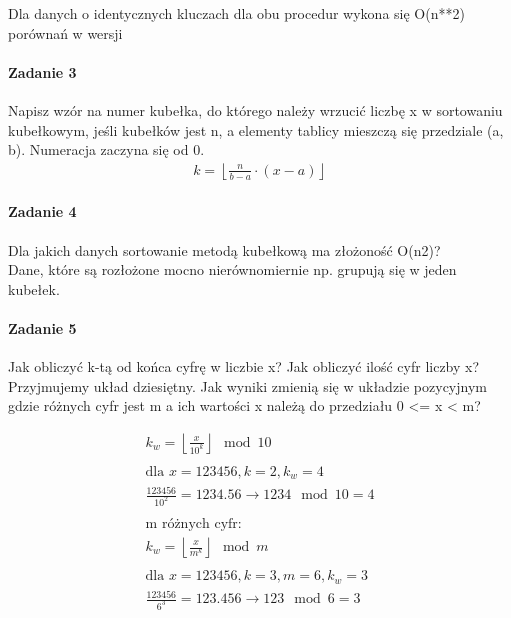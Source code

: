 \documentclass[18pt]{extarticle}
\begin{document}
Dla danych o identycznych kluczach dla obu procedur wykona się O(n**2) porównań w wersji 


\paragraph{Zadanie 3} Napisz wzór na numer kubełka, do którego należy wrzucić liczbę x w sortowaniu kubełkowym, jeśli kubełków jest n, a elementy tablicy mieszczą się przedziale (a, b). Numeracja zaczyna się od 0. \\


\begin{align*}
    k = \left \lfloor \frac{n}{b - a} \cdot (x - a) \right \rfloor
\end{align*}

\paragraph{Zadanie 4} Dla jakich danych sortowanie metodą kubełkową ma złożoność O(n2)? \\


Dane, które są rozłożone mocno nierównomiernie np. grupują się w jeden kubełek.

\paragraph{Zadanie 5} Jak obliczyć k-tą od końca cyfrę w liczbie x? Jak obliczyć ilość cyfr liczby x? Przyjmujemy układ dziesiętny. Jak wyniki zmienią się w układzie pozycyjnym gdzie różnych cyfr jest m a ich wartości x należą do przedziału 0 <= x < m?


\begin{gather*}
    k_w = \left \lfloor \frac{x}{10^k} \right \rfloor \mod 10 \\ \\
    \text{dla }x = 123456, k = 2, k_w = 4 \\ 
    \frac{123456}{10^2} = 1234.56 \rightarrow 1234 \mod 10 = 4 \\ \\
    \text{m różnych cyfr:} \\
    k_w = \left \lfloor \frac{x}{m^k} \right \rfloor \mod m \\ \\
    \text{dla }x = 123456, k = 3, m = 6, k_w = 3 \\
    \frac{123456}{6^3} = 123.456 \rightarrow 123 \mod 6 = 3
\end{gather*}
\end{document}
